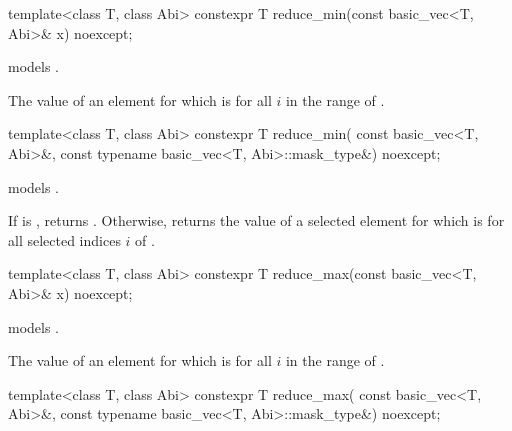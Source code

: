 \begin{itemdecl}
template<class T, class Abi> constexpr T reduce_min(const basic_vec<T, Abi>& x) noexcept;
\end{itemdecl}

\begin{itemdescr}
\pnum
\constraints
{} models .

\pnum
\returns
The value of an element  for which  is
 for all $i$ in the range of .
\end{itemdescr}

\begin{itemdecl}
template<class T, class Abi>
  constexpr T reduce_min(
    const basic_vec<T, Abi>&, const typename basic_vec<T, Abi>::mask_type&) noexcept;
\end{itemdecl}

\begin{itemdescr}
\pnum
\constraints
{} models .

\pnum
\returns
If  is , returns
.
Otherwise, returns the value of a selected element  for which
 is  for all selected indices $i$ of
.
\end{itemdescr}

\begin{itemdecl}
template<class T, class Abi> constexpr T reduce_max(const basic_vec<T, Abi>& x) noexcept;
\end{itemdecl}

\begin{itemdescr}
\pnum
\constraints
{} models .

\pnum
\returns
The value of an element  for which  is
 for all $i$ in the range of .
\end{itemdescr}

\begin{itemdecl}
template<class T, class Abi>
  constexpr T reduce_max(
    const basic_vec<T, Abi>&, const typename basic_vec<T, Abi>::mask_type&) noexcept;
\end{itemdecl}

